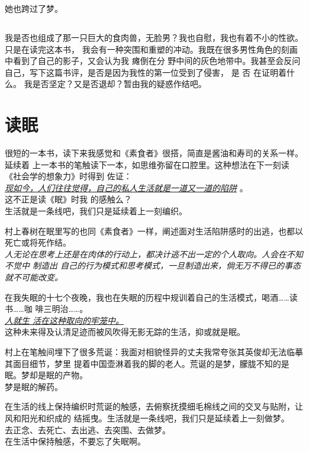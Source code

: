 \documentclass[a5paper, twoside]{article}
\let\oldemph\emph
\renewcommand{\emph}[1]{{\oldemph{#1}}}
\begin{document}
她也跨过了梦。

\subsection{}

我是否也组成了那一只巨大的食肉兽，无脸男？我也自慰，我也有着不小的性欲。只是在读完这本书，
我会有一种突围和重塑的冲动。我既在很多男性角色的刻画中看到了自己的影子，又会认为我
瘫倒在分
野中间的灰色地带中。我甚至会反问自己，写下这篇书评，是否是因为我性的第一位受到了侵害，
是
否
在证明着什么。
我是否坚定？又是否退却？暂由我的疑惑作结吧。

\newpage
\section{读眠}

很短的一本书，读下来我感觉和《素食者》很搭，简直是酱油和寿司的关系一样。延续着
上一本书的笔触读下一本，如思维弥留在口腔里。这种想法在下一刻读《社会学的想象力》时得到
佐证：\\\underline{\emph{现如今，人们往往觉得，自己的私人生活就是一道又一道的陷阱}}
。
\\这不正是读《眠》时我
的感触么？\\生活就是一条线吧，我们只是延续着上一刻编织。

村上春树在眠里写的也同《素食者》一样，阐述面对生活陷阱感时的出逃，也都以死亡或将死作结。
\\\emph{人无论在思考上还是在肉体的行动上，都决计逃不出一定的个人取向。人会在不知不觉中
制造出
自己的行为模式和思考模式，一旦制造出来，倘无万不得已的事态就不可能改变。}

在我失眠的十七个夜晚，我也在失眠的历程中规训着自己的生活模式，喝酒……读书……咖
啡三明治……。\\\emph{\underline{人就生
	活在这种取向的牢笼中。}}
\\这种未来得及认清足迹而被风吹得无影无踪的生活，抑或就是眠。

村上在笔触间埋下了很多荒诞：我面对相貌怪异的丈夫我常夸张其英俊却无法临摹其面目细节，梦里
提着中国壶淋着我的脚的老人。荒诞的是梦，朦胧不知的是眠。梦却是眠的产物。\\梦是眠的解药。

在生活的线上保持编织时荒诞的触感，去俯察抚摸细毛棉线之间的交叉与贴附，让风和阳光和织成的
结摇曳。生活就是一条线吧，我们只是延续着上一刻做梦。
\\去正念、去死亡、去出逃、去突围、去做梦。
\\在生活中保持触感，不要忘了失眠啊。
\end{document}
